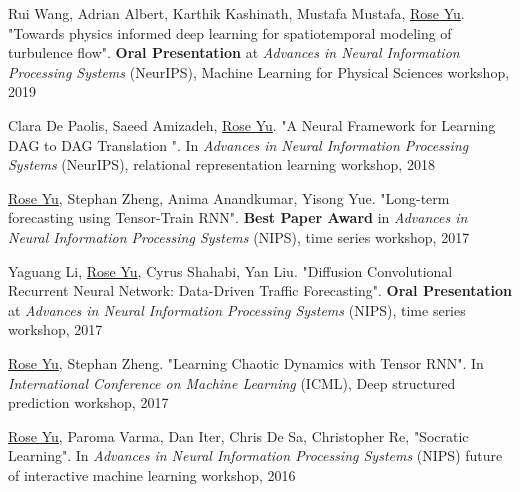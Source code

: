 \documentclass[margin,line]{res}
\begin{document}
\begin{resume}
\begin{enumerate}[label={[W\arabic*]}]
\item Rui Wang, Adrian Albert, Karthik Kashinath, Mustafa Mustafa, \underline{Rose Yu}. "Towards physics informed deep learning for spatiotemporal modeling of turbulence flow". \textbf{Oral Presentation} at \textit{Advances in Neural Information Processing Systems} (NeurIPS), Machine Learning for Physical Sciences  workshop, 2019

\item Clara De Paolis, Saeed Amizadeh, \underline{Rose Yu}.  "A Neural Framework for Learning DAG to DAG Translation ". In  \textit{Advances in Neural Information Processing Systems} (NeurIPS), relational representation learning workshop, 2018

\item \underline{Rose Yu}, Stephan Zheng, Anima Anandkumar, Yisong Yue. "Long-term forecasting using Tensor-Train RNN". \textbf{Best Paper Award}  in \textit{Advances in Neural Information Processing Systems} (NIPS), time series workshop, 2017


\item Yaguang Li, \underline{Rose Yu}, Cyrus Shahabi, Yan Liu. "Diffusion Convolutional Recurrent Neural Network: Data-Driven Traffic Forecasting". \textbf{Oral Presentation} at \textit{Advances in Neural Information Processing Systems} (NIPS), time series workshop, 2017


\item \underline{Rose Yu}, Stephan Zheng. "Learning Chaotic Dynamics with Tensor RNN". In  \textit{International Conference on Machine Learning} (ICML), Deep structured prediction workshop, 2017

\item \underline{Rose Yu},  Paroma Varma, Dan Iter, Chris De Sa, Christopher Re,  "Socratic Learning".  In \textit{Advances in Neural Information Processing Systems}  (NIPS) future of interactive machine learning workshop, 2016

%
%
%
\end{enumerate}



\end{resume}
\end{document}
